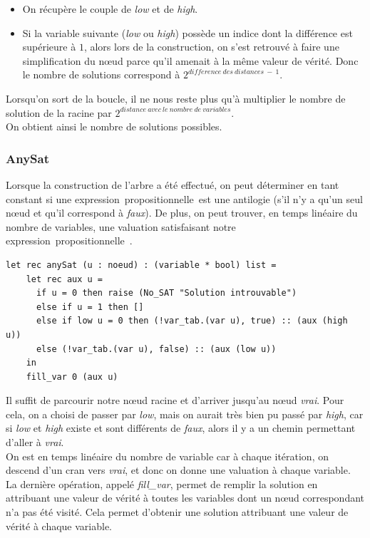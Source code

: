 \documentclass[a4paper, oneside]{report}
\newcommand{\expp}{expression~propositionnelle~}
\begin{document}
\begin{itemize}
\item On récupère le couple de \textit{low} et de \textit{high}.
\item Si la variable suivante (\textit{low} ou \textit{high}) possède un indice dont la différence est supérieure à $1$, alors lors de la construction, on s'est retrouvé à faire une simplification du nœud parce qu'il amenait à la même valeur de vérité. Donc le nombre de solutions correspond à $2^{difference~des~distances~-~1}$.
\end{itemize}
Lorsqu'on sort de la boucle, il ne nous reste plus qu'à multiplier le nombre de solution de la racine par $2^{distance~avec~le~nombre~de~variables}$.\\
On obtient ainsi le nombre de solutions possibles.

\subsubsection{AnySat}

Lorsque la construction de l'arbre a été effectué, on peut déterminer en tant constant si une \expp est une antilogie (s'il n'y a qu'un seul nœud et qu'il correspond à \textit{faux}). De plus, on peut trouver, en temps linéaire du nombre de variables, une valuation satisfaisant notre \expp.

\begin{lstlisting}
let rec anySat (u : noeud) : (variable * bool) list =
    let rec aux u = 
      if u = 0 then raise (No_SAT "Solution introuvable")
      else if u = 1 then []
      else if low u = 0 then (!var_tab.(var u), true) :: (aux (high u))
      else (!var_tab.(var u), false) :: (aux (low u))
    in
    fill_var 0 (aux u)
\end{lstlisting}
Il suffit de parcourir notre nœud racine et d'arriver jusqu'au nœud \textit{vrai}. Pour cela, on a choisi de passer par \textit{low}, mais on aurait très bien pu passé par \textit{high}, car si \textit{low} et \textit{high} existe et sont différents de \textit{faux}, alors il y a un chemin permettant d'aller à \textit{vrai}.\\
On est en temps linéaire du nombre de variable car à chaque itération, on descend d'un cran vers \textit{vrai}, et donc on donne une valuation à chaque variable.\\
La dernière opération, appelé \textit{fill\_var}, permet de remplir la solution en attribuant une valeur de vérité à toutes les variables dont un nœud correspondant n'a pas été visité. Cela permet d'obtenir une solution attribuant une valeur de vérité à chaque variable.
\end{document}
